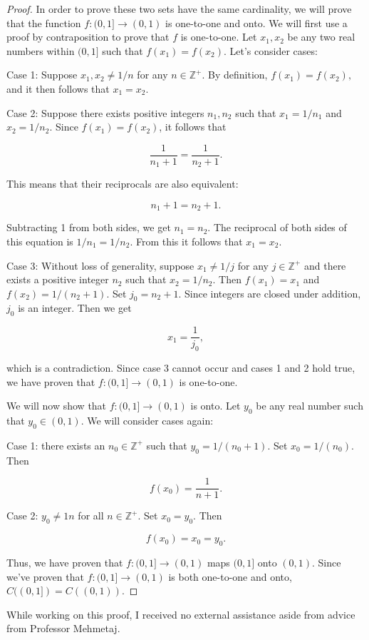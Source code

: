 \documentclass[12pt]{article}
\begin{document}
\begin{proof} In order to prove these two sets have the same cardinality, we will prove that the function $f : (0, 1] \to (0, 1) $ is one-to-one and onto. We will first use a proof by contraposition to prove that $f$ is one-to-one. Let $x_1, x_2$ be any two real numbers within $(0, 1]$ such that $f(x_1) = f(x_2)$. Let's consider cases:
    
    Case 1: Suppose $x_1, x_2 \neq 1/n$ for any $n \in \mathbb{Z}^+$. By definition, $f(x_1) = f(x_2),$ and it then follows that $x_1 = x_2$. 
    
    Case 2: Suppose there exists positive integers $n_1, n_2$ such that $x_1 = 1/n_1$ and $x_2 = 1/n_2$. Since $f(x_1) = f(x_2)$, it follows that

    $$\frac{1}{n_1 + 1} = \frac{1}{n_2 + 1}.$$

    This means that their reciprocals are also equivalent:

    $$n_1 + 1 = n_2 + 1.$$

    Subtracting 1 from both sides, we get $n_1 = n_2$. The reciprocal of both sides of this equation is $1/n_1 = 1/n_2$. From this it follows that $x_1 = x_2$.

    Case 3: Without loss of generality, suppose $x_1 \neq 1/j$ for any $j \in \mathbb{Z}^+$ and there exists a positive integer $n_2$ such that $x_2 = 1/n_2$. Then $f(x_1) = x_1$ and $f(x_2) = 1/(n_2 + 1)$. Set $j_0 = n_2 + 1$. Since integers are closed under addition, $j_0$ is an integer. Then we get

    $$x_1 = \frac{1}{j_0},$$

    which is a contradiction. Since case 3 cannot occur and cases 1 and 2 hold true, we have proven that $f: (0, 1] \to (0, 1)$ is one-to-one.

    \noindent
    We will now show that $f: (0, 1] \to (0, 1) $ is onto. Let $y_0$ be any real number such that $y_0 \in (0, 1)$. We will consider cases again:

    Case 1: there exists an $n_0 \in \mathbb{Z}^+$ such that $y_0 = 1/(n_0 + 1)$. Set $x_0 = 1/(n_0)$. Then 
    
    $$f(x_0) = \frac{1}{n+1}.$$

    Case 2: $y_0 \neq 1 n$ for all $n \in \mathbb{Z}^+$. Set $x_0 = y_0$. Then

    $$f(x_0) = x_0 = y_0.$$

    Thus, we have proven that $f: (0, 1] \to (0, 1) $ maps $(0, 1]$ onto $(0, 1)$. Since we've proven that $f: (0, 1] \to (0, 1) $ is both one-to-one and onto, $C((0, 1]) = C((0, 1))$.

\end{proof}


\noindent While working on this proof, I received no external assistance aside from advice from Professor Mehmetaj.
\end{document}
